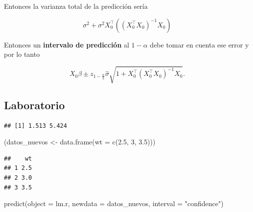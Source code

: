 \documentclass[
  12pt,
]{book}
\newenvironment{Shaded}{\begin{snugshade}}{\end{snugshade}}
\newcommand{\AttributeTok}[1]{\textcolor[rgb]{0.77,0.63,0.00}{#1}}
\newcommand{\DecValTok}[1]{\textcolor[rgb]{0.00,0.00,0.81}{#1}}
\newcommand{\FloatTok}[1]{\textcolor[rgb]{0.00,0.00,0.81}{#1}}
\newcommand{\FunctionTok}[1]{\textcolor[rgb]{0.00,0.00,0.00}{#1}}
\newcommand{\NormalTok}[1]{#1}
\newcommand{\OtherTok}[1]{\textcolor[rgb]{0.56,0.35,0.01}{#1}}
\newcommand{\SpecialCharTok}[1]{\textcolor[rgb]{0.00,0.00,0.00}{#1}}
\newcommand{\StringTok}[1]{\textcolor[rgb]{0.31,0.60,0.02}{#1}}
\begin{document}
Entonces la varianza total de la predicción sería

\begin{equation*}
\sigma^{2} +  \sigma^{2}X_{0}^{\top}((X_{0}^{\top}X_{0})^{-1}X_{0}) 
\end{equation*}

Entonces un \textbf{intervalo de predicción} al \(1-\alpha\) debe tomar
en cuenta ese error y por lo tanto

\begin{equation*}
X_{0}\beta \pm z_{1-\frac{\alpha}{2}} \hat{\sigma} \sqrt{1+X_{0}^{\top}(X_{0}^{\top}X_{0})^{-1}X_{0}}.
\end{equation*}

\hypertarget{laboratorio-4}{%
\subsection{Laboratorio}\label{laboratorio-4}}

\begin{Shaded}
\end{Shaded}

\begin{verbatim}
## [1] 1.513 5.424
\end{verbatim}

\begin{Shaded}
\begin{Highlighting}[]
\NormalTok{(datos\_nuevos }\OtherTok{\textless{}{-}} \FunctionTok{data.frame}\NormalTok{(}\AttributeTok{wt =} \FunctionTok{c}\NormalTok{(}\FloatTok{2.5}\NormalTok{, }\DecValTok{3}\NormalTok{, }\FloatTok{3.5}\NormalTok{)))}
\end{Highlighting}
\end{Shaded}

\begin{verbatim}
##    wt
## 1 2.5
## 2 3.0
## 3 3.5
\end{verbatim}

\begin{Shaded}
\begin{Highlighting}[]
\FunctionTok{predict}\NormalTok{(}\AttributeTok{object =}\NormalTok{ lm.r, }\AttributeTok{newdata =}\NormalTok{ datos\_nuevos, }\AttributeTok{interval =} \StringTok{"confidence"}\NormalTok{)}
\end{Highlighting}
\end{Shaded}
\end{document}
